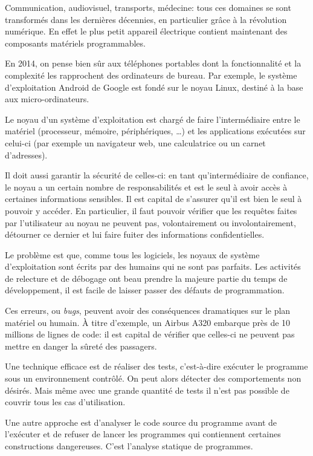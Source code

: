 Communication,
audiovisuel,
transports,
médecine:
tous ces domaines se sont transformés dans les dernières décennies,
en particulier grâce à la révolution numérique.
En effet le plus petit appareil électrique contient maintenant des composants
matériels programmables.

En 2014, on pense bien sûr aux téléphones portables dont la fonctionnalité et la
complexité les rapprochent des ordinateurs de bureau. Par exemple, le système
d'exploitation Android de Google est fondé sur le noyau Linux, destiné à la base
aux micro-ordinateurs.

Le noyau d'un système d'exploitation est chargé de faire l'intermédiaire entre
le matériel (processeur, mémoire, périphériques, …) et les applications
exécutées sur celui-ci (par exemple un navigateur web, une calculatrice ou un
carnet d'adresses).

Il doit aussi garantir la sécurité de celles-ci: en tant qu'intermédiaire de
confiance, le noyau a un certain nombre de responsabilités et est le seul à
avoir accès à certaines informations sensibles. Il est capital de s'assurer
qu'il est bien le seul à pouvoir y accéder. En particulier, il faut pouvoir
vérifier que les requêtes faites par l'utilisateur au noyau ne peuvent pas,
volontairement ou involontairement, détourner ce dernier et lui faire fuiter des
informations confidentielles.

Le problème est que, comme tous les logiciels, les noyaux de système
d'exploitation sont écrits par des humains qui ne sont pas parfaits. Les
activités de relecture et de débogage ont beau prendre la majeure partie du
temps de développement, il est facile de laisser passer des défauts de
programmation.

Ces erreurs, ou \emph{bugs}, peuvent avoir des conséquences dramatiques sur le
plan matériel ou humain. À titre d'exemple, un Airbus A320 embarque près de 10
millions de lignes de code: il est capital de vérifier que celles-ci ne peuvent
pas mettre en danger la sûreté des passagers.

Une technique efficace est de réaliser des tests, c'est-à-dire exécuter le
programme sous un environnement contrôlé. On peut alors détecter des
comportements non désirés. Mais même avec une grande quantité de tests il n'est
pas possible de couvrir tous les cas d'utilisation.

Une autre approche est d'analyser le code source du programme avant de
l'exécuter et de refuser de lancer les programmes qui contiennent certaines
constructions dangereuses. C'est l'analyse statique de programmes.

